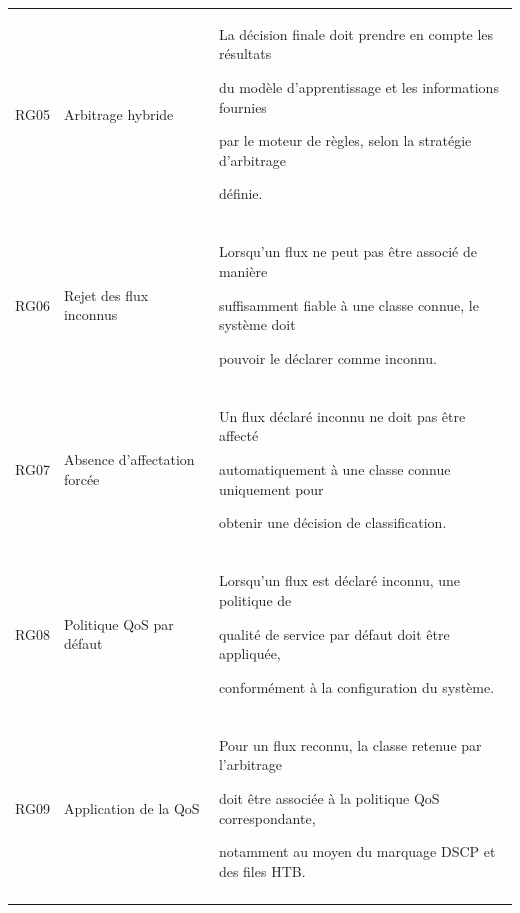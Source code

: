 \begin{table}[H]
\begin{tabularx}{\textwidth}{|p{1.4cm}|p{3.2cm}|Y|}
\hline



RG05 & Arbitrage hybride &

La décision finale doit prendre en compte les résultats

du modèle d'apprentissage et les informations fournies

par le moteur de règles, selon la stratégie d'arbitrage

définie. \\\\

\hline



RG06 & Rejet des flux inconnus &

Lorsqu'un flux ne peut pas être associé de manière

suffisamment fiable à une classe connue, le système doit

pouvoir le déclarer comme inconnu. \\\\

\hline



RG07 & Absence d'affectation forcée &

Un flux déclaré inconnu ne doit pas être affecté

automatiquement à une classe connue uniquement pour

obtenir une décision de classification. \\\\

\hline



RG08 & Politique QoS par défaut &

Lorsqu'un flux est déclaré inconnu, une politique de

qualité de service par défaut doit être appliquée,

conformément à la configuration du système. \\\\

\hline



RG09 & Application de la QoS &

Pour un flux reconnu, la classe retenue par l'arbitrage

doit être associée à la politique QoS correspondante,

notamment au moyen du marquage DSCP et des files HTB. \\\\


\end{tabularx}
\end{table}
